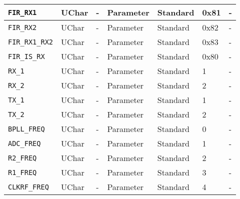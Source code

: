 \documentclass{article}
\begin{document}
\begin{landscape}
\begin{scriptsize}
\begin{longtable}{|p{3.6cm}|p{8.1cm}|p{1.4cm}|p{1.3cm}|p{1.4cm}|p{2.5cm}|p{3.6cm}|}
			\hline
      \verb+FIR_RX1+                   & UChar        & -               & Parameter             & Standard                         & 0x81                & - \\
			\hline
      \verb+FIR_RX2+                   & UChar        & -               & Parameter             & Standard                         & 0x82                & - \\
			\hline
      \verb+FIR_RX1_RX2+               & UChar        & -               & Parameter             & Standard                         & 0x83                & - \\
			\hline
      \verb+FIR_IS_RX+                 & UChar        & -               & Parameter             & Standard                         & 0x80                & - \\
			\hline
      \verb+RX_1+                      & UChar        & -               & Parameter             & Standard                         & 1                   & - \\
			\hline
      \verb+RX_2+                      & UChar        & -               & Parameter             & Standard                         & 2                   & - \\
			\hline
      \verb+TX_1+                      & UChar        & -               & Parameter             & Standard                         & 1                   & - \\
			\hline
      \verb+TX_2+                      & UChar        & -               & Parameter             & Standard                         & 2                   & - \\
			\hline
      \verb+BPLL_FREQ+                 & UChar        & -               & Parameter             & Standard                         & 0                   & - \\
			\hline
      \verb+ADC_FREQ+                  & UChar        & -               & Parameter             & Standard                         & 1                   & - \\
			\hline
      \verb+R2_FREQ+                   & UChar        & -               & Parameter             & Standard                         & 2                   & - \\
			\hline
      \verb+R1_FREQ+                   & UChar        & -               & Parameter             & Standard                         & 3                   & - \\
			\hline
      \verb+CLKRF_FREQ+                & UChar        & -               & Parameter             & Standard                         & 4                   & - \\

\end{longtable}
\end{scriptsize}
\end{landscape}
\end{document}
